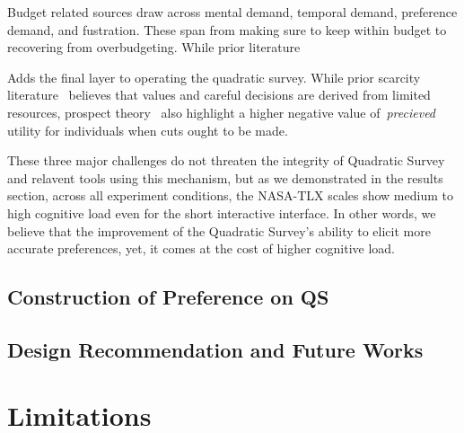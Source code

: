Budget related sources draw across mental demand, temporal demand, preference demand, and fustration. These span from making sure to keep within budget to recovering from overbudgeting. While prior literature 

Adds the final layer to operating the quadratic survey. While prior scarcity literature~\cite{Shah2015a} believes that values and careful decisions are derived from limited resources, prospect theory~\cite{kahnemanProspectTheoryAnalysis1979} also highlight a higher negative value of~\textit{precieved} utility for individuals when cuts ought to be made.

These three major challenges do not threaten the integrity of Quadratic Survey and relavent tools using this mechanism, but as we demonstrated in the results section, across all experiment conditions, the NASA-TLX scales show medium to high cognitive load even for the short interactive interface. In other words, we believe that the improvement of the Quadratic Survey's ability to elicit more accurate preferences, yet, it comes at the cost of higher cognitive load.


\subsection{Construction of Preference on QS}



\subsection{Design Recommendation and Future Works}



\section{Limitations}




